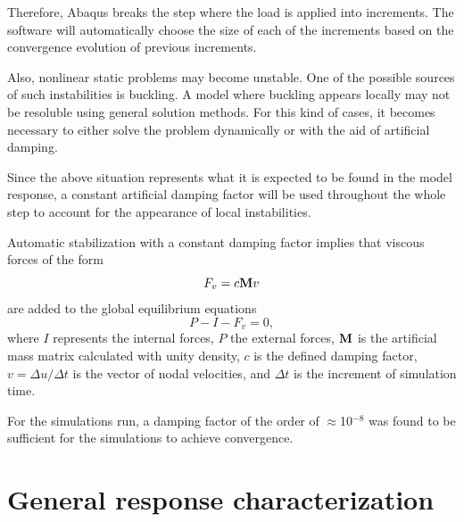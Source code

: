     Therefore, Abaqus breaks the step where the load is applied into increments. The software will automatically choose the size of each of the increments based on the convergence evolution of previous increments.

    Also, nonlinear static problems may become unstable. One of the possible sources of such instabilities is buckling. A model where buckling appears locally may not be resoluble using general solution methods. For this kind of cases, it becomes necessary to either solve the problem dynamically or with the aid of artificial damping.

    Since the above situation represents what it is expected to be found in the model response, a constant artificial damping factor will be used throughout the whole step to account for the appearance of local instabilities.  

    Automatic stabilization with a constant damping factor implies that viscous forces of the form
    $$
    F_v = c \mathrm{\textbf{M}} v
    $$
    are added to the global equilibrium equations
    $$
    P - I - F_v = 0,
    $$
    where $I$ represents the internal forces, $P$ the external forces, $\mathrm{\textbf{M}}$ is the artificial mass matrix calculated with unity density, $c$ is the defined damping factor, $v = \Delta u / \Delta t$ is the vector of nodal velocities, and $\Delta t$ is the increment of simulation time.

    For the simulations run, a damping factor of the order of $\approx$10$^{-8}$ was found to be sufficient for the simulations to achieve convergence.

\section{General response characterization} \label{sec:generalResponseCharact}

